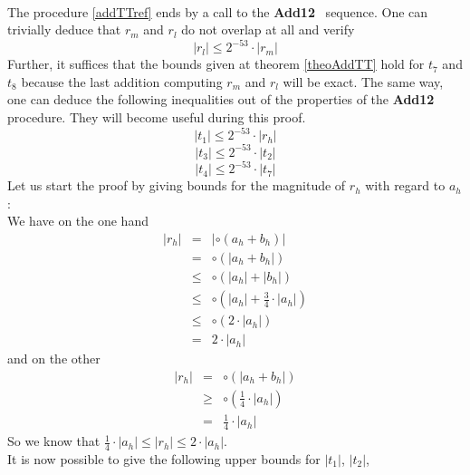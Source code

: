 \documentclass[a4paper,10pt,twoside]{article}
\newenvironment{proof}[1][Proof]{\begin{trivlist}
\item[\hskip \labelsep {\bfseries #1}]}{\end{trivlist}}
\newcommand{\hi}{\ensuremath{\mathit{h}}}
\newcommand{\mi}{\ensuremath{\mathit{m}}}
\newcommand{\lo}{\ensuremath{\mathit{l}}}
\newcommand{\Add}{{\bf Add12}}
\begin{document}
\begin{proof} ~ \\
The procedure \ref{addTTref} ends by a call to the \Add~ sequence. One can
trivially deduce that $r_\mi$ and $r_\lo$ do not overlap at all and verify 
$$\left \vert r_\lo \right \vert \leq 2^{-53} \cdot \left \vert r_\mi \right \vert$$
Further, it suffices that the bounds given at theorem \ref{theoAddTT} hold for
$t_7$ and $t_8$ because 
the last addition computing $r_\mi$ and $r_\lo$ will be exact.
The same way, one can deduce the following inequalities out of the properties
of the \Add~ procedure. They will become useful during this proof. 
$$\left \vert t_1 \right \vert \leq 2^{-53} \cdot \left \vert r_\hi \right \vert$$
$$\left \vert t_3 \right \vert \leq 2^{-53} \cdot \left \vert t_2 \right \vert$$
$$\left \vert t_4 \right \vert \leq 2^{-53} \cdot \left \vert t_7 \right \vert$$
Let us start the proof by giving bounds for the magnitude of $r_\hi$ with
regard to $a_\hi$:\\
We have on the one hand
\begin{eqnarray*}
\left \vert r_\hi \right \vert & = & \left \vert \circ\left( a_\hi + b_\hi \right) \right \vert \\
& = & \circ \left( \left \vert a_\hi + b_\hi \right \vert \right) \\
& \leq & \circ \left( \left \vert a_\hi \right \vert + \left \vert b_\hi \right \vert \right) \\
& \leq & \circ \left( \left \vert a_\hi \right \vert + \frac{3}{4} \cdot \left \vert a_\hi \right \vert \right) \\
& \leq & \circ \left( 2 \cdot \left \vert a_\hi \right \vert \right) \\
& = & 2 \cdot \left \vert a_\hi \right \vert
\end{eqnarray*}
and on the other
\begin{eqnarray*}
\left \vert r_\hi \right \vert & = & \circ \left( \left \vert a_\hi + b_\hi \right \vert \right) \\
& \geq & \circ \left( \frac{1}{4} \cdot \left \vert a_\hi \right \vert \right) \\
& = & \frac{1}{4} \cdot \left \vert a_\hi \right \vert
\end{eqnarray*}
So we know that $\frac{1}{4} \cdot \left \vert a_\hi \right \vert \leq \left \vert r_\hi \right \vert \leq 2 \cdot \left \vert a_\hi \right \vert$.\\
It is now possible to give the following upper bounds for 
$\left \vert t_1 \right \vert$, $\left \vert t_2 \right \vert$, 

\end{proof}
\end{document}
